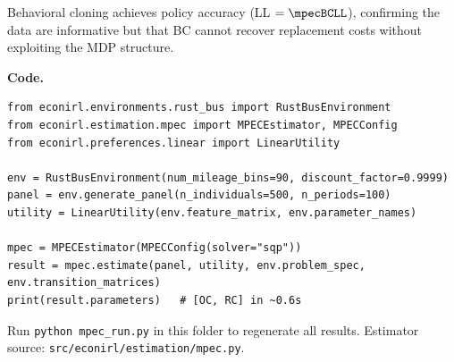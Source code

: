 \documentclass[10pt]{article}
\begin{document}
Behavioral cloning achieves \mpecBCacc{} policy accuracy (LL $= \mpecBCLL$), confirming the data are informative but that BC cannot recover replacement costs without exploiting the MDP structure.

\textbf{Code.}
\begin{lstlisting}
from econirl.environments.rust_bus import RustBusEnvironment
from econirl.estimation.mpec import MPECEstimator, MPECConfig
from econirl.preferences.linear import LinearUtility

env = RustBusEnvironment(num_mileage_bins=90, discount_factor=0.9999)
panel = env.generate_panel(n_individuals=500, n_periods=100)
utility = LinearUtility(env.feature_matrix, env.parameter_names)

mpec = MPECEstimator(MPECConfig(solver="sqp"))
result = mpec.estimate(panel, utility, env.problem_spec, env.transition_matrices)
print(result.parameters)   # [OC, RC] in ~0.6s
\end{lstlisting}

Run \texttt{python mpec\_run.py} in this folder to regenerate all results.
Estimator source: \texttt{src/econirl/estimation/mpec.py}.



\end{document}

